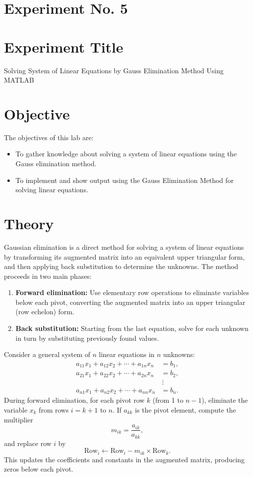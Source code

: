 \documentclass[a4paper,12pt]{article}
\begin{document}
	\section{Experiment No. 5}
	
	\section{Experiment Title }
Solving System of Linear Equations by Gauss Elimination Method Using MATLAB
	\section{Objective}
	
	The objectives of this lab are:
	\begin{itemize}
		\item To gather knowledge about solving a system of linear equations using the Gauss elimination method.
		\item To implement and show output using the Gauss Elimination Method for solving linear equations.
		
		
	\end{itemize}
	\section{Theory}

	Gaussian elimination is a direct method for solving a system of linear equations by transforming its augmented matrix into an equivalent upper triangular form, and then applying back substitution to determine the unknowns. The method proceeds in two main phases:
	\begin{enumerate}
		\item \textbf{Forward elimination:} Use elementary row operations to eliminate variables below each pivot, converting the augmented matrix into an upper triangular (row echelon) form.
		\item \textbf{Back substitution:} Starting from the last equation, solve for each unknown in turn by substituting previously found values.
	\end{enumerate}
	
	Consider a general system of $n$ linear equations in $n$ unknowns:
	\begin{align}
		a_{11}x_1 + a_{12}x_2 + \cdots + a_{1n}x_n &= b_1, \\
		a_{21}x_1 + a_{22}x_2 + \cdots + a_{2n}x_n &= b_2, \\
		&\,\vdots \nonumber \\
		a_{n1}x_1 + a_{n2}x_2 + \cdots + a_{nn}x_n &= b_n.
	\end{align}
	During forward elimination, for each pivot row $k$ (from 1 to $n-1$), eliminate the variable $x_k$ from rows $i=k+1$ to $n$. If $a_{kk}$ is the pivot element, compute the multiplier
	\[
	m_{ik} = \frac{a_{ik}}{a_{kk}},
	\]
	and replace row $i$ by
	\[
	\text{Row}_i \leftarrow \text{Row}_i - m_{ik} \times \text{Row}_k.
	\]
	This updates the coefficients and constants in the augmented matrix, producing zeros below each pivot.
	
\end{document}
